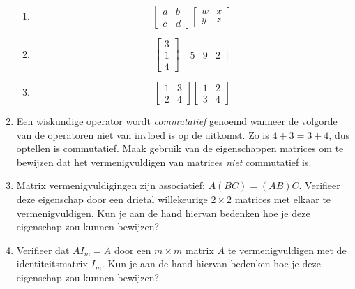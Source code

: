\begin{enumerate}
\begin{multicols}{2}
\begin{enumerate}
  \item  
  \[
  \begin{bmatrix}a&b\\c&d\end{bmatrix}
  \begin{bmatrix}w&x\\y&z\end{bmatrix}  
  \] 
  
  
  \item  
  \[
  \begin{bmatrix}3\\1\\4\end{bmatrix}
  \begin{bmatrix}5&9&2\end{bmatrix}  
  \] 
   
   
  \item
  \[
  \begin{bmatrix}1&3\\2&4\end{bmatrix}
  \begin{bmatrix}1&2\\3&4\end{bmatrix}
  \]
  
  \end{enumerate}
  \end{multicols}
  
  

\item
Een wiskundige operator wordt \textit{commutatief} genoemd wanneer de volgorde van de operatoren niet van invloed is op de uitkomst. Zo is $4+3 = 3+4$, dus optellen is commutatief. Maak gebruik van de eigenschappen matrices om te bewijzen dat het vermenigvuldigen van matrices \textit{niet} commutatief is.

\item
Matrix vermenigvuldigingen zijn associatief: $A(BC) = (AB)C$. Verifieer deze eigenschap door een drietal willekeurige $2 \times 2$ matrices met elkaar te vermenigvuldigen. Kun je aan de hand hiervan bedenken hoe je deze eigenschap zou kunnen bewijzen?

\item
Verifieer dat $AI_m=A$ door een $m \times m$ matrix $A$ te vermenigvuldigen met de identiteitsmatrix $I_m$. Kun je aan de hand hiervan bedenken hoe je deze eigenschap zou kunnen bewijzen?

\end{enumerate}